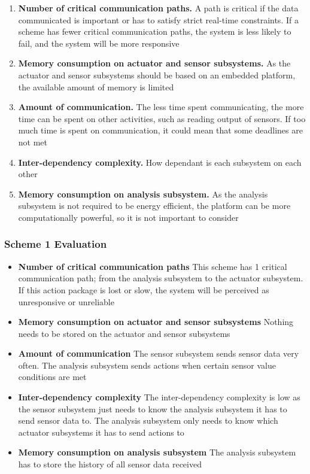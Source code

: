 \begin{enumerate}
\item \textbf{Number of critical communication paths.} A path is critical if the data communicated is important or has to satisfy strict real-time constraints. If a scheme has fewer critical communication paths, the system is less likely to fail, and the system will be more responsive
\item \textbf{Memory consumption on actuator and sensor subsystems.} As the actuator and sensor subsystems should be based on an embedded platform, the available amount of memory is limited
\item \textbf{Amount of communication.} The less time spent communicating, the more time can be spent on other activities, such as reading output of sensors. If too much time is spent on communication, it could mean that some deadlines are not met
\item \textbf{Inter-dependency complexity.} How dependant is each subsystem on each other
\item \textbf{Memory consumption on analysis subsystem.} As the analysis subsystem is not required to be energy efficient, the platform can be more computationally powerful, so it is not important to consider
\end{enumerate}

\subsubsection{Scheme 1 Evaluation}
\begin{itemize}
\item \textbf{Number of critical communication paths} This scheme has 1 critical communication path; from the analysis subsystem to the actuator subsystem. If this action package is lost or slow, the system will be perceived as unresponsive or unreliable
\item \textbf{Memory consumption on actuator and sensor subsystems} Nothing needs to be stored on the actuator and sensor subsystems
\item \textbf{Amount of communication} The sensor subsystem sends sensor data very often. The analysis subsystem sends actions when certain sensor value conditions are met
\item \textbf{Inter-dependency complexity} The inter-dependency complexity is low as the sensor subsystem just needs to know the analysis subsystem it has to send sensor data to. The analysis subsystem only needs to know which actuator subsystems it has to send actions to
\item \textbf{Memory consumption on analysis subsystem} The analysis subsystem has to store the history of all sensor data received
\end{itemize}

